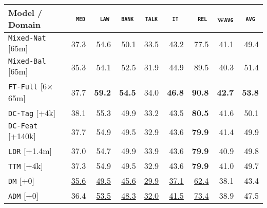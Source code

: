 \documentclass[11pt,a4paper]{article}
\newcommand{\fyDone}[1]{\done[FY]\Todo[FY:]{\textcolor{orange}{#1}}}
\newcommand{\domain}[1]{\texttt{\textsc{#1}}}
\newcommand{\system}[1]{\texttt{{#1}}}
\newcommand{\SB}[1]{\textbf{#1}}
\newcommand{\SW}[1]{\underline{#1}}
\begin{document}
\begin{table*}
  \centering
  \fyDone{Fix column size}
  \begin{tabular}{|p{4cm}|*{8}{r|}} \hline
    Model / Domain & \multicolumn{1}{c|}{\domain{ med}} & \multicolumn{1}{c|}{\domain{ law}} & \multicolumn{1}{c|}{\domain{bank}} & \multicolumn{1}{c|}{\domain{talk}} & \multicolumn{1}{c|}{\domain{ it }} & \multicolumn{1}{c|}{\domain{ rel}} & \multicolumn{1}{c|}{w\domain{avg}} & \multicolumn{1}{c|}{\domain{avg}} \\ \hline %
    \system{Mixed-Nat}  \hfill{\footnotesize[65m]} & 37.3 & 54.6 & 50.1 & 33.5 & 43.2 & 77.5  & 41.1  & 49.4 \\%
    \system{Mixed-Bal}   \hfill{\footnotesize[65m]} &  35.3 & 54.1 & 52.5 & 31.9 & 44.9 & 89.5 & 40.3  & 51.4 \\ %
    \system{FT-Full}       \hfill{\footnotesize[6$\times$65m]} & 37.7 & \SB{59.2} & \SB{54.5} & 34.0 & \SB{46.8} & \SB{90.8}   & \SB{42.7} & \SB{53.8} \\ \hline
    \system{DC-Tag} \hfill{\footnotesize[+4k]}        & 38.1 & 55.3 & 49.9   & 33.2 & 43.5 & \SB{80.5} &41.6 & 50.1    \\%
    \system{DC-Feat} \hfill{\footnotesize[+140k]}    & 37.7  & 54.9 & 49.5   & 32.9 & 43.6 & \SB{79.9} &41.4 & 49.9   \\%
    \system{LDR}       \hfill{\footnotesize[+1.4m]}    & 37.0   & 54.7 & 49.9 & 33.9 & 43.6 & \SB{79.9} &40.9 & 49.8          \\%
    \system{TTM}      \hfill{\footnotesize[+4k]}        & 37.3 & 54.9 & 49.5 & 32.9 & 43.6 & \SB{79.9} &41.0 & 49.7     \\%
    \system{DM}        \hfill{\footnotesize[+0]}         & \SW{35.6} & \SW{49.5}  & \SW{45.6}& \SW{29.9} & \SW{37.1} & \SW{62.4} & 38.1 & 43.4 \\ %
    \system{ADM}      \hfill{\footnotesize[+0]}         & 36.4 & \SW{53.5}  & \SW{48.3} & \SW{32.0} & \SW{41.5} & \SW{73.4} & 38.9 & 47.5 \\%

\end{tabular}
\end{table*}
\end{document}
